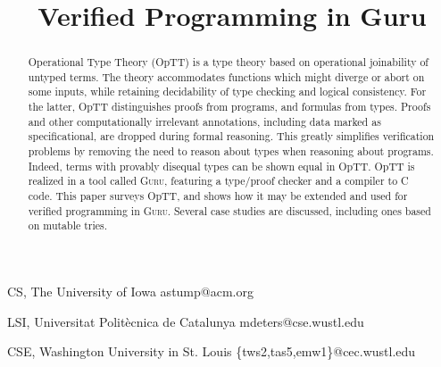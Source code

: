 \documentclass[preprint,natbib]{sigplanconf}
\begin{document}
\copyrightdata{\ } 

\titlebanner{\ }        %
\preprintfooter{\ }   %



\title{Verified Programming in Guru}

{CS, The University of Iowa}
{astump@acm.org}

{LSI, Universitat Polit\`{e}cnica de Catalunya }
{mdeters@cse.wustl.edu}

{CSE, Washington University in St. Louis}
{\{tws2,tas5,emw1\}@cec.wustl.edu}



\maketitle


\begin{abstract}
Operational Type Theory (OpTT) is a type theory based on operational
joinability of untyped terms.  The theory accommodates functions which
might diverge or abort on some inputs, while retaining decidability of
type checking and logical consistency.  For the latter, OpTT
distinguishes proofs from programs, and formulas from types.  Proofs
and other computationally irrelevant annotations, including data
marked as specificational, are dropped during formal reasoning.  This
greatly simplifies verification problems by removing the need to
reason about types when reasoning about programs.  Indeed, terms with
provably disequal types can be shown equal in OpTT.  OpTT is realized
in a tool called \textsc{Guru}, featuring a type/proof checker and a
compiler to C code.  This paper surveys OpTT, and shows how it may be
extended and used for verified programming in \textsc{Guru}.  Several
case studies are discussed, including ones based on mutable tries.
\end{abstract}
\end{document}
